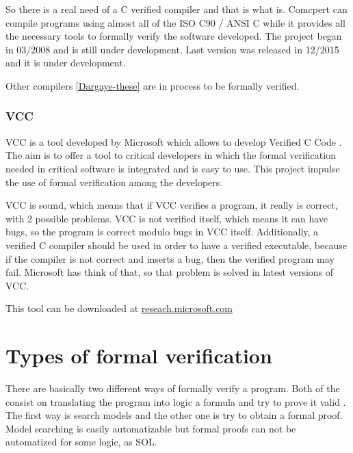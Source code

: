 So there is a real need of a C verified compiler and that is what  is. 
%
Comcpert can compile programs using almost all of the ISO C90 / ANSI C while it provides all the necessary tools to formally verify the software developed.
%
The project began in 03/2008 and is still under development. Last version was released in 12/2015 and it is under development.

Other compilers \ref{Dargaye-these} are in process to be formally verified.


\subsubsection{VCC}

\gls{VCC} is a tool developed by Microsoft which allows to develop Verified C Code \cite{VCC}. 
%
The aim is to offer a tool to critical developers in which the formal verification needed in critical software is integrated and is easy to use.
%
This project impulse the use of formal verification among the developers.

VCC is sound, which means that if VCC verifies a program, it really is correct, with 2 possible problems.
%
VCC is not verified itself, which means it can have bugs, so the program is correct modulo bugs in VCC itself.
%
Additionally, a verified C compiler should be used in order to have a verified executable, because if the compiler is not correct and inserts a bug, then the verified program may fail.
%
Microsoft has think of that, so that problem is solved in latest versions of VCC. 

This tool can be downloaded at \href{http://research.microsoft.com/en-us/projects/vcc/}{reseach.microsoft.com}





\section{Types of formal verification}

There are basically two different ways of formally verify a program. 
%
Both of the consist on translating the program into logic a formula and try to prove it valid \cite{ScalableTechniques}.
%
The first way is search models and the other one is try to obtain a formal proof. 
%
Model searching is easily automatizable but formal proofs can not be automatized for some logic, as \gls{SOL}.


